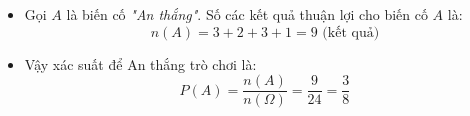 \documentclass[12pt,a4paper]{article}
\begin{document}
\begin{ex}
{\begin{apdungbox}
\begin{itemize}
\begin{itemize}
        \item \textbf{Trường hợp 4:} Với $b=4 \Rightarrow b+1=5$. Ta cần $a^5 \vdots 5 \Leftrightarrow a \vdots 5$. \\
        Suy ra $a \in \{5\}$ $\Rightarrow$ Có $\mathbf{1}$ cách chọn.
    \end{itemize}
    
    \item Gọi $A$ là biến cố \textit{"An thắng"}. Số các kết quả thuận lợi cho biến cố $A$ là:
    \[ n(A) = 3 + 2 + 3 + 1 = 9 \text{ (kết quả)} \]
    
    \item Vậy xác suất để An thắng trò chơi là:
    \[ P(A) = \displaystyle\frac{n(A)}{n(\Omega)} = \displaystyle\frac{9}{24} = \displaystyle\frac{3}{8} \]
\end{itemize}
\end{apdungbox}
}
\end{ex}
\end{document}
